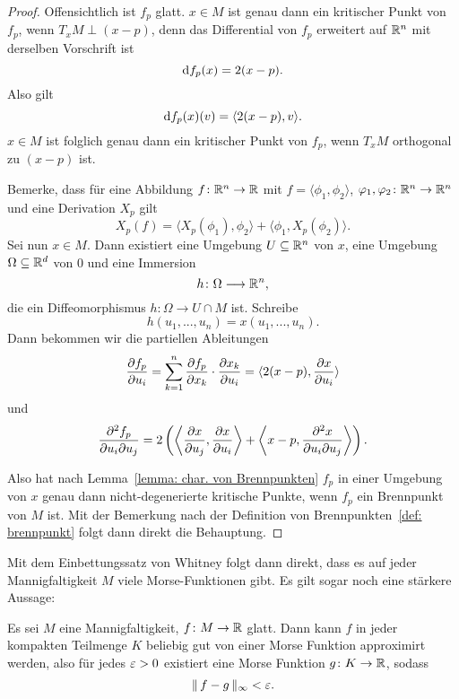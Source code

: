 \begin{proof}
    Offensichtlich ist $f_p$ glatt. $x \in M$ ist genau dann ein kritischer Punkt von $f_p$, wenn
    $T_xM \perp (x - p)$, denn das Differential von $f_p$ erweitert auf ${ \mathbb R }^n$ mit derselben Vorschrift
    ist
    \[ { \operatorname{d} } f_p (x) = 2 (x - p). \]
    Also gilt
    \[ { \operatorname{d} } f_p (x) (v) = \langle 2 (x - p), v \rangle . \]
    $x \in M$ ist folglich genau dann ein kritischer Punkt von $f_p$, wenn $T_xM$ orthogonal 
    zu $(x - p)$ ist.

    Bemerke, dass für eine Abbildung $f \colon { \mathbb R }^n \to { \mathbb R }$ mit $f = \langle \phi_1, \phi_2 \rangle$,
    $\varphi_1, \varphi_2 \colon { \mathbb R }^n \to { \mathbb R }^n$ und eine Derivation $X_p$ gilt 
    \[ X_p (f) = \langle X_p(\phi_1), \phi_2 \rangle + \langle \phi_1, X_p(\phi_2) \rangle.  \]
    Sei nun $x \in M$. Dann existiert eine Umgebung $U \subseteq { \mathbb R }^n$ von $x$, eine Umgebung 
    $\Omega \subseteq { \mathbb R }^d$ von $0$ und eine Immersion 
    \[ h \colon \Omega \longrightarrow { \mathbb R }^n , \]
    die ein Diffeomorphismus $h \colon \Omega \to U \cap M$ ist.
    Schreibe
    \[ h(u_1, ..., u_n) = x(u_1, ..., u_n). \]
    Dann bekommen wir die partiellen Ableitungen
    \[ 
        \pderive[f_p]{u_i} = \sum_{k = 1}^n \pderive[f_p]{x_k} \cdot \pderive[x_k]{u_i} 
        = \langle 2(x - p), \pderive[x]{u_i} \rangle 
    \]
    und 
    \[ 
        \pdderive[f_p]{u_i}{u_j} = 
            2 \left( \left\langle \pderive[x]{u_j}, \pderive[x]{u_i} \right\rangle + 
            \left\langle x - p , \pdderive[x]{u_i}{u_j} \right\rangle \right) 
    . \]
    
    Also hat nach Lemma~\ref{lemma: char. von Brennpunkten} $f_p$ in einer Umgebung von $x$ genau 
    dann nicht-degenerierte kritische Punkte, wenn $f_p$ ein Brennpunkt von $M$ ist. Mit der 
    Bemerkung nach der Definition von Brennpunkten~\ref{def: brennpunkt} folgt dann direkt die 
    Behauptung.
\end{proof}

\begin{remark}
    Mit dem Einbettungssatz von Whitney folgt dann direkt, dass es auf jeder Mannigfaltigkeit 
    $M$ viele Morse-Funktionen gibt. Es gilt sogar noch eine stärkere Aussage:
\end{remark}

\begin{theorem}
    \label{satz: morse-approximation}
    Es sei $M$ eine Mannigfaltigkeit, $f \colon M \to { \mathbb R }$ glatt. Dann kann $f$ in jeder kompakten
    Teilmenge $K$ beliebig gut von einer Morse Funktion approximirt werden, also für jedes 
    $\varepsilon > 0$ existiert eine Morse Funktion $g \colon K \to { \mathbb R }$, sodass 
    \[ \| \, f - g \, \|_{\infty} < \varepsilon . \]
\end{theorem}

